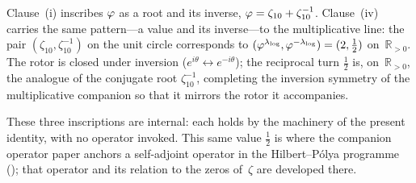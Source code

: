 \begin{Remark}\label{rem:inversion-image}
Clause~(i) inscribes $\varphi$ as a root and its inverse,
$\varphi=\zeta_{10}+\zeta_{10}^{-1}$.  Clause~(iv) carries the same
pattern---a value and its inverse---to the multiplicative line: the pair
$(\zeta_{10},\zeta_{10}^{-1})$ on the unit circle corresponds to
$(\varphi^{\lambda_{\log}},\varphi^{-\lambda_{\log}})=(2,\tfrac12)$
on~$\mathbb{R}_{>0}$.  The rotor is closed under inversion
($e^{i\theta}\leftrightarrow e^{-i\theta}$); the reciprocal turn
$\tfrac12$ is, on~$\mathbb{R}_{>0}$, the analogue of the conjugate root
$\zeta_{10}^{-1}$, completing the inversion symmetry of the
multiplicative companion so that it mirrors the rotor it accompanies.
\end{Remark}

These three inscriptions are internal: each holds by the machinery of
the present identity, with no operator invoked.  This same value
$\tfrac12$ is where the companion operator paper anchors a self-adjoint
operator in the Hilbert--P\'olya programme ();
that operator and its relation to the zeros of~$\zeta$ are developed
there.

